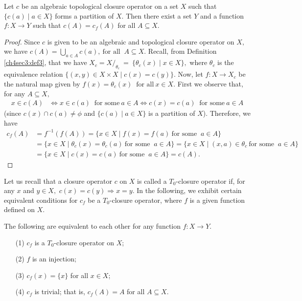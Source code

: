 \documentclass[
11pt,%
tightenlines,%
twoside,%
onecolumn,%
nofloats,%
nobibnotes,%
nofootinbib,%
superscriptaddress,%
noshowpacs,%
centertags]%
{revtex4}
\begin{document}
\begin{theorem}
\label{ch4sec4:thm7} Let $c$ be an algebraic topological closure
operator on a set $X$  such that $\{c(a) \mid a \in X \}$  forms a
partition of $X.$ Then there exist a set $Y$ and a function $f : X
\longrightarrow Y$ such that $c(A) = c_f(A)$ for all $A \subseteq
X.$
\end{theorem}
\begin{proof}
Since $c$ is given to be an algebraic and topological closure
operator on   $X,$  we have $c(A)= \bigcup \limits _{a \in A}
c(a),~\text{for all }~ A \subseteq X.$ Recall, from Definition
\ref{ch4sec3:def3},  that we have  $X_c = X / _{\theta_c} ~=~ \{
\theta_c (x) \mid x \in X \},$ where $\theta_c$ is the equivalence
relation $\{ (x,y) \in X \times X \mid c(x) = c(y)\}.$ Now, let $f:
X \longrightarrow X_c$ be the natural map given by $f(x) = \theta_c
(x) ~ \text{ for all}~ x \in X.$ First we observe that, for any $A
\subseteq X,$
\begin{align*}
x \in c(A) & \Longleftrightarrow x \in c(a) ~\text{ for some}~ a \in A
 \Longleftrightarrow c(x) = c(a) ~\text{ for some}~ a \in A
\end{align*}
(since $ c(x) \cap c(a) \neq \phi $ and $\{ c(a) \mid a \in X \}$ is
a partition of $X$).  Therefore, we have
\begin{align*}
c_f(A) & = f^{-1}(f(A))
 = \{ x \in X \mid f(x) = f(a) ~\text{for some }~ a \in A \} \\
& = \{ x \in X \mid \theta_c (x) = \theta_c (a) ~\text{for some }~ a
\in A \} = \{ x \in X \mid (x,a) \in \theta_c ~\text{for some }~ a \in A \} \\
& = \{ x \in X \mid c(x) = c(a) ~\text{for some }~ a \in A \} = c(A).
\end{align*}
\end{proof}Let us recall that a closure operator $c$ on $X$ is called a
$T_0$-closure operator if, for any $x$ and $y \in X,$
$c(x) = c(y) \Longrightarrow x = y .$
 In the following, we exhibit certain equivalent conditions for $c_f$ be
 a $T_0$-closure operator, where $f$ is a given function defined on $X.$
\begin{theorem}
\label{ch4sec4:thm8}
The following are equivalent to each other for any function $f: X \longrightarrow Y.$
\begin{itemize}
\item[(1)] $c_f $  is a $ T_0$-closure operator on $X$;
\item[(2)] $f$ is an injection;
\item[(3)] $c_f (x) = \{ x\}$ for all $x \in X$;
\item[(4)] $c_f$ is trivial; that is, $c_f (A) = A$ for all $A \subseteq X.$
\end{itemize}
\end{theorem}
\end{document}
